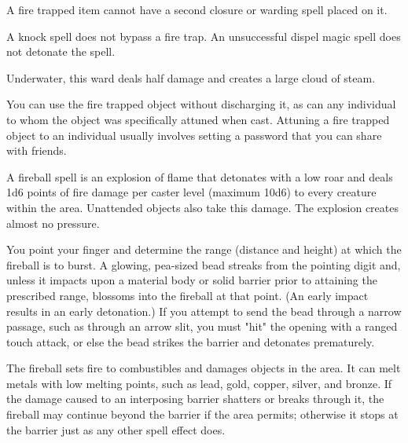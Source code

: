 \begin{multicols}{2}
\begin{small}
\smallskip\noindent A fire trapped item cannot have a second closure or warding spell placed on it.

\smallskip\noindent A knock spell does not bypass a fire trap.  An unsuccessful dispel magic spell does not detonate the spell.

\smallskip\noindent Underwater, this ward deals half damage and creates a large cloud of steam.

\smallskip\noindent You can use the fire trapped object without discharging it, as can any individual to whom the object was specifically attuned when cast. Attuning a fire trapped object to an individual usually involves setting a password that you can share with friends.


\noindent A fireball spell is an explosion of flame that detonates with a low roar and deals 1d6 points of fire damage per caster level (maximum 10d6) to every creature within the area. Unattended objects also take this damage. The explosion creates almost no pressure.

\smallskip\noindent You point your finger and determine the range (distance and height) at which the fireball is to burst. A glowing, pea-sized bead streaks from the pointing digit and, unless it impacts upon a material body or solid barrier prior to attaining the prescribed range, blossoms into the fireball at that point. (An early impact results in an early detonation.) If you attempt to send the bead through a narrow passage, such as through an arrow slit, you must "hit" the opening with a ranged touch attack, or else the bead strikes the barrier and detonates prematurely.

\smallskip\noindent The fireball sets fire to combustibles and damages objects in the area. It can melt metals with low melting points, such as lead, gold, copper, silver, and bronze. If the damage caused to an interposing barrier shatters or breaks through it, the fireball may continue beyond the barrier if the area permits; otherwise it stops at the barrier just as any other spell effect does.


\end{small}
\end{multicols}
